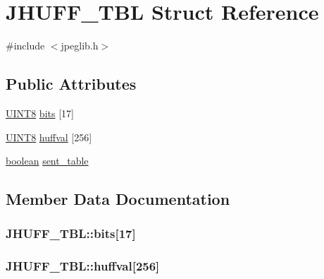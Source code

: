 \hypertarget{structJHUFF__TBL}{}\section{J\+H\+U\+F\+F\+\_\+\+T\+B\+L Struct Reference}
\label{structJHUFF__TBL}


{\ttfamily \#include $<$jpeglib.\+h$>$}

\subsection*{Public Attributes}
\begin{DoxyCompactItemize}
\item 
\hyperlink{jmorecfg_8h_adfb9a8ea1dd59f151065f763e1e9acd6}{U\+I\+N\+T8} \hyperlink{structJHUFF__TBL_a68b0ec25d6d06c13e0a4f74fbb683b3f}{bits} \mbox{[}17\mbox{]}
\item 
\hyperlink{jmorecfg_8h_adfb9a8ea1dd59f151065f763e1e9acd6}{U\+I\+N\+T8} \hyperlink{structJHUFF__TBL_a7aad276f6ced97323bb94ba5e6220961}{huffval} \mbox{[}256\mbox{]}
\item 
\hyperlink{jmorecfg_8h_a7c6368b321bd9acd0149b030bb8275ed}{boolean} \hyperlink{structJHUFF__TBL_a387c655e83d0d57c50802856d630f37b}{sent\+\_\+table}
\end{DoxyCompactItemize}


\subsection{Member Data Documentation}
\hypertarget{structJHUFF__TBL_a68b0ec25d6d06c13e0a4f74fbb683b3f}{}
\subsubsection[{bits}]{ J\+H\+U\+F\+F\+\_\+\+T\+B\+L\+::bits\mbox{[}17\mbox{]}}\label{structJHUFF__TBL_a68b0ec25d6d06c13e0a4f74fbb683b3f}
\hypertarget{structJHUFF__TBL_a7aad276f6ced97323bb94ba5e6220961}{}
\subsubsection[{huffval}]{ J\+H\+U\+F\+F\+\_\+\+T\+B\+L\+::huffval\mbox{[}256\mbox{]}}\label{structJHUFF__TBL_a7aad276f6ced97323bb94ba5e6220961}
\hypertarget{structJHUFF__TBL_a387c655e83d0d57c50802856d630f37b}{}
